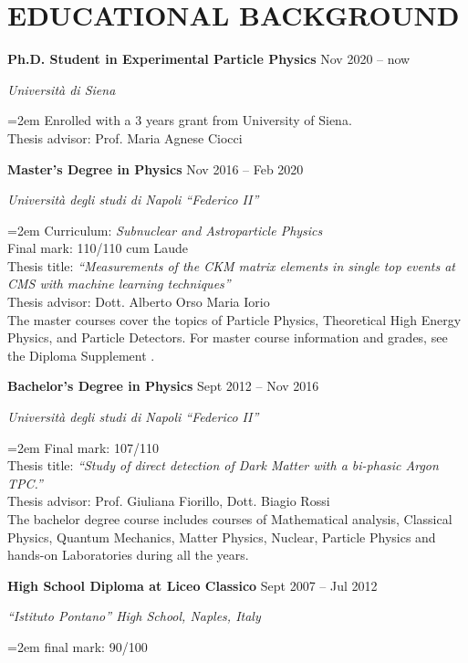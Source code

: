 \documentclass[paper=a4,fontsize=12pt]{article} %
\newcommand{\openquote}{``}
\newcommand{\closequote}{''}
\newcommand{\sepspace}{\vspace*{1em}}		%
\newcommand{\NewPart}[1]{\section*{\uppercase{#1}}}
\newcommand{\EducationEntry}[4]{
	\noindent \textbf{#1} \hfill      %
	{#2} \par  %
	\noindent \textit{#3} \par        %
	\noindent\hangindent=2em\hangafter=0 \small #4 %
	\normalsize \par}
\begin{document}
	\NewPart{Educational background}
	\EducationEntry{Ph.D. Student in Experimental Particle Physics}{Nov 2020 -- now}{Università di Siena}{Enrolled with a 3 years grant from University of Siena.\\Thesis advisor: Prof. Maria Agnese Ciocci}
	\sepspace
	\EducationEntry{Master's Degree in Physics}{Nov 2016 -- Feb 2020}{Università degli studi di Napoli \openquote Federico II\closequote}{Curriculum: \textit{Subnuclear and Astroparticle Physics} \\Final mark: 110/110 cum Laude\\
	Thesis title: \textit{``Measurements of the CKM matrix elements in single top events at
			CMS with machine learning techniques''}  \cite{thesis}\\
		Thesis advisor: Dott. Alberto Orso Maria Iorio\\ The master courses cover the topics of Particle Physics, Theoretical High Energy Physics, and Particle Detectors. For master course information and grades, see the Diploma Supplement \cite{diploma_supplement}.	}
	\sepspace
	\EducationEntry{Bachelor's Degree in Physics}{Sept 2012 -- Nov 2016}{Università degli studi di Napoli \openquote Federico II\closequote}
	{Final mark:  107/110\\
		Thesis title: \textit{``Study of direct detection of Dark Matter with a bi-phasic Argon TPC.''}\\
		Thesis advisor: Prof. Giuliana Fiorillo, Dott. Biagio Rossi \\
		The bachelor degree course includes courses of Mathematical analysis, Classical Physics, Quantum Mechanics, Matter Physics, Nuclear, Particle Physics and hands-on Laboratories during all the years.}
\sepspace
\EducationEntry{High School Diploma at Liceo Classico}{Sept 2007 -- Jul 2012}{``Istituto Pontano'' High School, Naples, Italy}
{final mark: 90/100}
\sepspace
   
\end{document}
